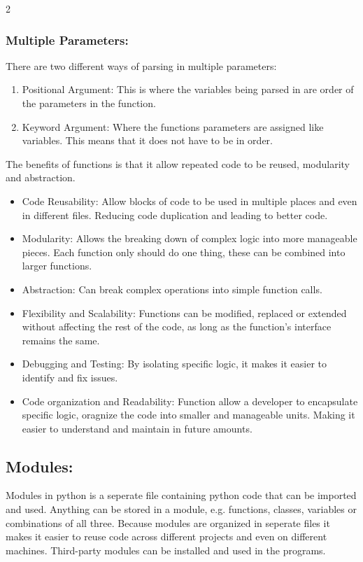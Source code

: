 \documentclass[a4paper]{report}
\begin{document}
\begin{flushleft}
\begin{multicols}{2}
	\subsubsection*{Multiple Parameters:}
	There are two different ways of parsing in multiple parameters:
	\begin{enumerate}
		\item Positional Argument: This is where the variables being parsed in are order of the parameters in the function.
		\item Keyword Argument: Where the functions parameters are assigned like variables. This means that it does not have to be in order.
	\end{enumerate}
	The benefits of functions is that it allow repeated code to be reused, modularity and abstraction.
	\begin{itemize}
		\item Code Reusability: Allow blocks of code to be used in multiple places and even in different files. Reducing code duplication and leading to better code.
		\item Modularity: Allows the breaking down of complex logic into more manageable pieces. Each function only should do one thing, these can be combined into larger functions.
		\item Abstraction: Can break complex operations into simple function calls.
		\item Flexibility and Scalability: Functions can be modified, replaced or extended without affecting the rest of the code, as long as the function's interface remains the same.
		\item Debugging and Testing: By isolating specific logic, it makes it easier to identify and fix issues.
		\item Code organization and Readability: Function allow a developer to encapsulate specific logic, oragnize the code into smaller and manageable units. Making it easier to understand and maintain in future amounts.
	\end{itemize}

	\subsection*{Modules:}
	Modules in python is a seperate file containing python code that can be imported and used. Anything can be stored in a module, e.g. functions, classes, variables or combinations of all three. Because modules are organized in seperate files it makes it easier to reuse code across different projects and even on different machines. Third-party modules can be installed and used in the programs.


\end{multicols}
\end{flushleft}
\end{document}
